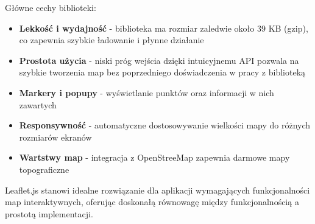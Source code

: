 Główne cechy biblioteki:
\begin{itemize}
	\item \textbf{Lekkość i wydajność} - biblioteka ma rozmiar zaledwie około 39 KB (gzip), co zapewnia szybkie ładowanie i płynne działanie
	\item \textbf{Prostota użycia} - niski próg wejścia dzięki intuicyjnemu API pozwala na szybkie tworzenia map bez poprzedniego doświadczenia w pracy z biblioteką
	\item \textbf{Markery i popupy} - wyświetlanie punktów oraz informacji w nich zawartych
	\item \textbf{Responsywność} - automatyczne dostosowywanie wielkości mapy do różnych rozmiarów ekranów
	\item \textbf{Wartstwy map} - integracja z OpenStreeMap zapewnia darmowe mapy topograficzne
\end{itemize}

Leaflet.js stanowi idealne rozwiązanie dla aplikacji wymagających funkcjonalności map interaktywnych, oferując doskonałą równowagę między funkcjonalnością a prostotą implementacji.
